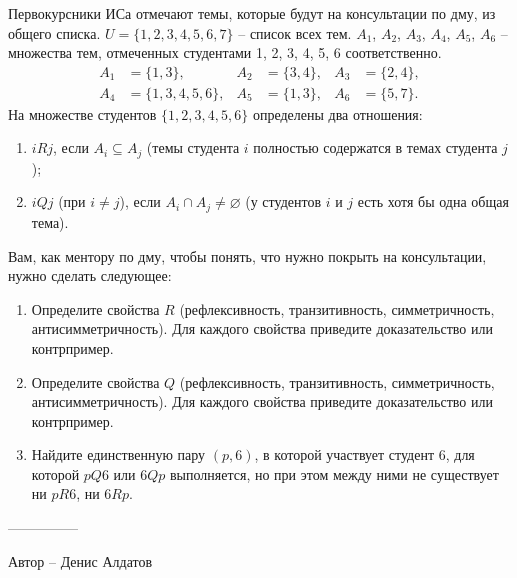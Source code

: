 \question
Первокурсники ИСа отмечают темы, которые будут на консультации по дму, из общего списка. $U = \{1, 2, 3, 4, 5, 6, 7\}$ -- список всех тем. $A_1$, $A_2$, $A_3$, $A_4$, $A_5$, $A_6$ -- множества тем, отмеченных студентами 1, 2, 3, 4, 5, 6 соответственно.
\\
\begin{align*}
    A_1 &= \{1, 3\}, & A_2 &= \{3, 4\}, & A_3 &= \{2, 4\}, \\
    A_4 &= \{1, 3, 4, 5, 6\}, & A_5 &= \{1, 3\}, & A_6 &= \{5, 7\}.
\end{align*}
На множестве студентов $\{1, 2, 3, 4, 5, 6\}$ определены два отношения:
\begin{enumerate}
    \renewcommand{\labelenumi}{\arabic{enumi})}
    \item $iRj$, если $A_i \subseteq A_j$ (темы студента $i$ полностью содержатся в темах студента $j$);
    \item $iQj$ (при $i \ne j$), если $A_i \cap A_j \ne \varnothing$ (у студентов $i$ и $j$ есть хотя бы одна общая тема).
\end{enumerate}
Вам, как ментору по дму, чтобы понять, что нужно покрыть на консультации, нужно сделать следующее:
\begin{enumerate}
    \renewcommand{\labelenumi}{\alph{enumi})}
    \item Определите свойства $R$ (рефлексивность, транзитивность, симметричность, антисимметричность). Для каждого свойства приведите доказательство или контрпример.
    \item Определите свойства $Q$ (рефлексивность, транзитивность, симметричность, антисимметричность). Для каждого свойства приведите доказательство или контрпример.
    \item Найдите единственную пару $(p, 6)$, в которой участвует студент 6, для которой $pQ6$ или $6Qp$ выполняется, но при этом между ними не существует ни $pR6$, ни $6Rp$.
\end{enumerate}

---------------

Автор -- Денис Алдатов
